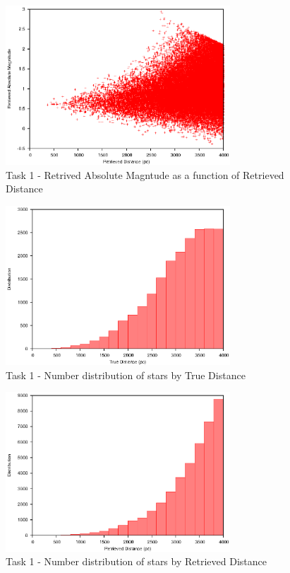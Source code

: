 \documentclass[a4paper,12pt]{article}
\begin{document}
\begin{figure}[H]
\centering
\includegraphics[width=0.75\textwidth]{./Task1/Graph1}
\caption{Task 1 - Retrived Absolute Magntude as a function of Retrieved Distance}
\label{fig:t1graph1}
\end{figure}

\begin{figure}[H]
\centering
\includegraphics[width=0.75\textwidth]{./Task1/Graph2}
\caption{Task 1 - Number distribution of stars by True Distance}
\label{fig:t1graph2}
\end{figure}

\begin{figure}[H]
\centering
\includegraphics[width=0.75\textwidth]{./Task1/Graph3}
\caption{Task 1 - Number distribution of stars by Retrieved Distance}
\label{fig:t1graph3}
\end{figure}
\newpage
\end{document}
